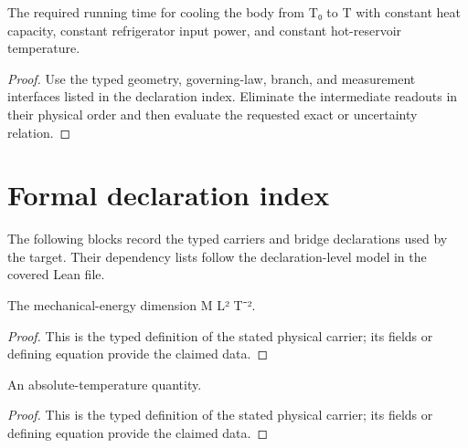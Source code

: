 \begin{theorem}
  \label{thm:physics:IPhO_2026_3_C_4:target}
  The required running time for cooling the body from T₀ to T with constant heat capacity, constant refrigerator input power, and constant hot-reservoir temperature.
\end{theorem}
\begin{proof}
  Use the typed geometry, governing-law, branch, and measurement interfaces listed in the declaration index.  Eliminate the intermediate readouts in their physical order and then evaluate the requested exact or uncertainty relation.
\end{proof}
\section*{Formal declaration index}
The following blocks record the typed carriers and bridge declarations used by the target.  Their dependency lists follow the declaration-level model in the covered Lean file.

\begin{definition}
  \label{def:physics:IPhO_2026_3_C_4:aux001}
  The mechanical-energy dimension M L² T⁻².
\end{definition}
\begin{proof}
  This is the typed definition of the stated physical carrier; its fields or defining equation provide the claimed data.
\end{proof}

\begin{definition}
  \label{def:physics:IPhO_2026_3_C_4:aux002}
  An absolute-temperature quantity.
\end{definition}
\begin{proof}
  This is the typed definition of the stated physical carrier; its fields or defining equation provide the claimed data.
\end{proof}


